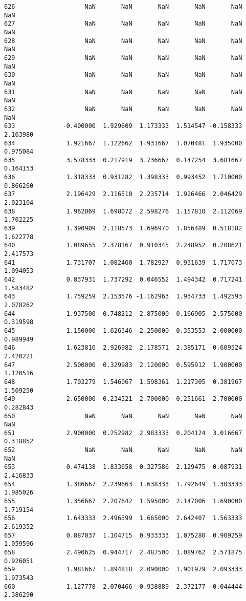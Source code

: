 \documentclass[11pt]{article}
\begin{document}
\begin{Verbatim}[commandchars=\\\{\}]
626                   NaN       NaN       NaN       NaN       NaN       NaN
627                   NaN       NaN       NaN       NaN       NaN       NaN
628                   NaN       NaN       NaN       NaN       NaN       NaN
629                   NaN       NaN       NaN       NaN       NaN       NaN
630                   NaN       NaN       NaN       NaN       NaN       NaN
631                   NaN       NaN       NaN       NaN       NaN       NaN
632                   NaN       NaN       NaN       NaN       NaN       NaN
633             -0.400000  1.929609  1.173333  1.514547 -0.158333  2.163980
634              1.921667  1.122662  1.931667  1.070481  1.935000  0.975084
635              3.578333  0.217919  3.736667  0.147254  3.681667  0.164153
636              1.318333  0.931282  1.398333  0.993452  1.710000  0.866260
637              2.196429  2.116510  2.235714  1.926466  2.046429  2.023104
638              1.962069  1.698072  2.598276  1.157810  2.112069  1.702225
639              1.390909  2.118573  1.696970  1.856489  0.518182  1.622778
640              1.089655  2.378167  0.910345  2.248952  0.208621  2.417573
641              1.731707  1.082460  1.782927  0.931639  1.717073  1.094053
642              0.837931  1.737292  0.046552  1.494342  0.717241  1.583482
643              1.759259  2.153576 -1.162963  1.934733  1.492593  2.078262
644              1.937500  0.748212  2.875000  0.166905  2.575000  0.319598
645              1.150000  1.626346 -2.250000  0.353553  2.000000  0.989949
646              1.623810  2.926982  2.178571  2.385171  0.609524  2.420221
647              2.500000  0.329983  2.120000  0.595912  1.900000  1.120516
648              1.703279  1.546067  1.598361  1.217305  0.381967  1.509250
649              2.650000  0.234521  2.700000  0.251661  2.700000  0.282843
650                   NaN       NaN       NaN       NaN       NaN       NaN
651              2.900000  0.252982  2.983333  0.204124  3.016667  0.318852
652                   NaN       NaN       NaN       NaN       NaN       NaN
653              0.474138  1.833658  0.327586  2.129475  0.087931  2.416833
654              1.386667  2.239663  1.638333  1.792649  1.303333  1.985026
655              1.356667  2.207642  1.595000  2.147006  1.690000  1.719154
656              1.643333  2.496599  1.665000  2.642407  1.563333  2.619352
657              0.887037  1.104715  0.933333  1.075280  0.909259  1.059596
658              2.490625  0.944717  2.487500  1.089762  2.571875  0.926051
659              1.981667  1.894818  2.090000  1.901979  2.093333  1.973543
660              1.127778  2.070466  0.938889  2.372177 -0.044444  2.386290

\end{Verbatim}
\end{document}

